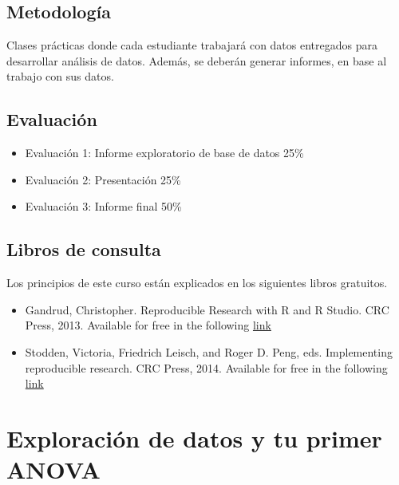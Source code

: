 \documentclass[]{book}
\providecommand{\tightlist}{%
  \setlength{\itemsep}{0pt}\setlength{\parskip}{0pt}}
\begin{document}
\hypertarget{metodologia}{%
\section{Metodología}\label{metodologia}}

Clases prácticas donde cada estudiante trabajará con datos entregados para desarrollar análisis de datos. Además, se deberán generar informes, en base al trabajo con sus datos.

\hypertarget{evaluacion}{%
\section{Evaluación}\label{evaluacion}}

\begin{itemize}
\tightlist
\item
  Evaluación 1: Informe exploratorio de base de datos 25\%
\item
  Evaluación 2: Presentación 25\%
\item
  Evaluación 3: Informe final 50\%
\end{itemize}

\hypertarget{libros-de-consulta}{%
\section{Libros de consulta}\label{libros-de-consulta}}

Los principios de este curso están explicados en los siguientes libros gratuitos.

\begin{itemize}
\tightlist
\item
  Gandrud, Christopher. Reproducible Research with R and R Studio. CRC Press, 2013. Available for free in the following
  \href{https://englianhu.files.wordpress.com/2016/01/reproducible-research-with-r-and-studio-2nd-edition.pdf}{link}
\item
  Stodden, Victoria, Friedrich Leisch, and Roger D. Peng, eds. Implementing reproducible research. CRC Press, 2014. Available for free in the following \href{http://web.stanford.edu/~vcs/papers/ijclp-STODDEN-2009.pdf}{link}
\end{itemize}

\hypertarget{Explorando}{%
\chapter{Exploración de datos y tu primer ANOVA}\label{Explorando}}
\end{document}
